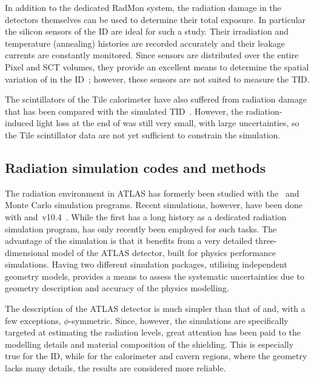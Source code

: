 \documentclass[cernpreprint, atlasdraft=false, UKenglish,british,orcidlogo, texmf, orcidlogo]{atlasdoc}
\begin{document}
In addition to the dedicated RadMon system, the radiation damage in the detectors themselves can be used to determine their total exposure.
In particular the silicon sensors of the \gls{ID} are ideal for such a study. Their irradiation and temperature (annealing)
histories are recorded accurately and their leakage currents are constantly monitored. Since sensors are distributed over the entire
Pixel and \gls{SCT} volumes, they provide an excellent means to determine the spatial variation of \phieqv in the \gls{ID}~\cite{IDET-2017-10};
however, these sensors are not suited to measure the \gls{TID}.
 
The scintillators of the Tile calorimeter have also suffered from radiation damage that has been compared with the simulated \gls{TID}~\cite{TileDamage}.
However, the radiation-induced light loss at the end of \RunTwo was still very small, with large uncertainties, so
the Tile scintillator data are not yet sufficient to constrain the simulation.
 
\subsection{Radiation simulation codes and methods}
 
The radiation environment in ATLAS has formerly been studied with the \fluka\,\cite{flukaref1, flukaref2, Ferrari:300336}
and \gcalor\,\cite{gcalorref} Monte Carlo simulation programs.
Recent simulations, however, have been done with \fluka and \,v10.4~\cite{Agostinelli:2002hh}. While the
first has a long history as a dedicated radiation simulation program,  has only recently been
employed for such tasks. The advantage of the  simulation is that it benefits from a very
detailed three-dimensional model of the ATLAS detector, built for physics performance simulations.
Having two different simulation packages, utilising independent geometry models, provides a
means to assess the systematic uncertainties due to geometry description and accuracy of the
physics modelling.
 
The \fluka description of the ATLAS detector is much simpler than that of  and, with a few
exceptions, $\phi$-symmetric.
Since, however, the \fluka simulations are specifically targeted at
estimating the radiation levels, great attention has been paid to the modelling details and material
composition of the shielding. This is especially true for the \gls{ID}, while for the calorimeter and cavern
regions, where the \fluka geometry lacks many details, the  results are considered more reliable.
 
\end{document}
